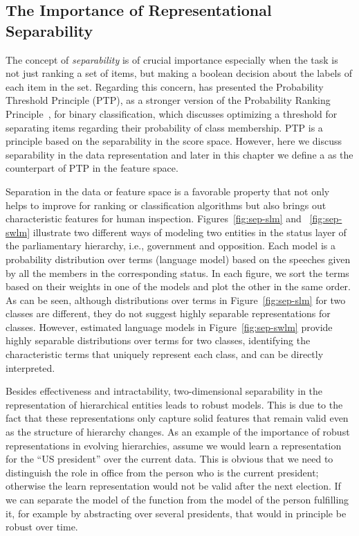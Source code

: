 \subsection{The Importance of Representational Separability}
The concept of \emph{separability} is of crucial importance especially when the task is not just ranking a set of items, but making a boolean decision about the labels of each item in the set.
Regarding this concern, \citet{Lewis:1995} has presented the Probability Threshold Principle (PTP), as a stronger version of the Probability Ranking Principle~\citep{Robertson:1977}, for binary classification, which discusses optimizing a threshold for separating items regarding their probability of class membership. 
PTP is a principle based on the separability in the score space. However, here we discuss separability in the data representation and later in this chapter we define a \emph{\ssp} as the counterpart of PTP in the feature space.

Separation in the data or feature space is a favorable property that not only helps to improve for ranking or classification algorithms but also brings out characteristic features for human inspection.
Figures~\ref{fig:sep-slm} and ~\ref{fig:sep-swlm} illustrate two different ways of modeling two entities in the status layer of the parliamentary hierarchy, i.e., government and opposition. 
Each model is a probability distribution over terms (language model) based on the speeches given by all the members in the corresponding status. In each figure, we sort the terms based on their weights in one of the models and plot the other in the same order. 
%
As can be seen, although distributions over terms in Figure~\ref{fig:sep-slm} for two classes are different, they do not suggest highly separable representations for classes. However, estimated language models in Figure~\ref{fig:sep-swlm} provide highly separable distributions over terms for two classes, identifying the characteristic terms that uniquely represent each class, and can be directly interpreted.  
 
Besides effectiveness and intractability, two-dimensional separability in the representation of hierarchical entities leads to robust models. This is due to the fact that these representations only capture solid features that remain valid even as the structure of hierarchy changes.
As an example of the importance of robust representations in evolving hierarchies, assume we would learn a representation for the ``US president'' over the current data. This is obvious that we need to distinguish the role in office from the person who is the current president; otherwise the learn representation would not be valid after the next election.  If we can separate the model of the function from the model of the person fulfilling it, for example by abstracting over several presidents, that would in principle be robust over time.

